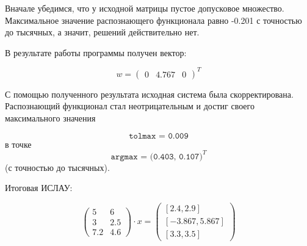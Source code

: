Вначале убедимся, что у исходной матрицы пустое допусковое множество. Максимальное значение распознающего функционала равно -0.201 с точностью до тысячных, а значит, решений действительно нет.

В результате работы  программы получен вектор:

\begin{equation}
w=\begin{pmatrix}
0 & 4.767 & 0
\end{pmatrix}^T
\end{equation}

С помощью полученного результата исходная система была скорректирована. Распознающий функционал стал неотрицательным и достиг своего максимального значения

\begin{equation}
\texttt{tolmax = 0.009}
\end{equation}
в точке 
\begin{equation}
\texttt{argmax = (0.403, 0.107)}^T
\end{equation}
(с точностью до тысячных).

Итоговая ИСЛАУ:

\begin{equation}
\begin{pmatrix}
	5 & 6 \\
	3 & 2.5 \\
	7.2 & 4.6
\end{pmatrix} \cdot x = 
\begin{pmatrix}
[2.4, 2.9] \\
[-3.867, 5.867] \\
[3.3, 3.5]
\end{pmatrix}
\end{equation}